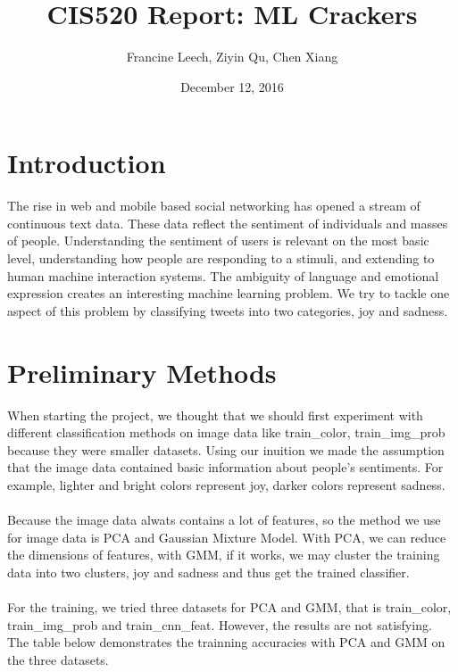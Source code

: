 \documentclass[]{article}
\begin{document}
\title{CIS520 Report: ML Crackers}   %
\author{Francine Leech, Ziyin Qu, Chen Xiang}         %
\date{December 12, 2016}    %
\maketitle

\section{Introduction}

The rise in web and mobile based social networking has opened a stream of continuous text data. These data reflect the sentiment of individuals and masses of people. Understanding the sentiment of users is relevant on the most basic level, understanding how people are responding to a stimuli, and extending to human machine interaction systems. The ambiguity of language and emotional expression creates an interesting machine learning problem.  We try to tackle one aspect of this problem by classifying tweets into two categories, joy and sadness. 

\section{Preliminary Methods}

When starting the project, we thought that we should first experiment with different classification methods on image data like train\_color, train\_img\_prob because they were smaller datasets. Using our inuition we made the assumption that the image data contained basic information about people's sentiments. For example, lighter and bright colors represent joy, darker colors represent sadness. \\\\

Because the image data alwats contains a lot of features, so the method we use for image data is PCA and Gaussian Mixture Model. With PCA, we can reduce the dimensions of features, with GMM, if it works, we may cluster the training data into two clusters, joy and sadness and thus get the trained classifier. \\\\

For the training, we tried three datasets for PCA and GMM, that is train\_color, train\_img\_prob and train\_cnn\_feat. However, the results are not satisfying. The table below demonstrates the trainning accuracies with PCA and GMM on the three datasets.
\end{document}
